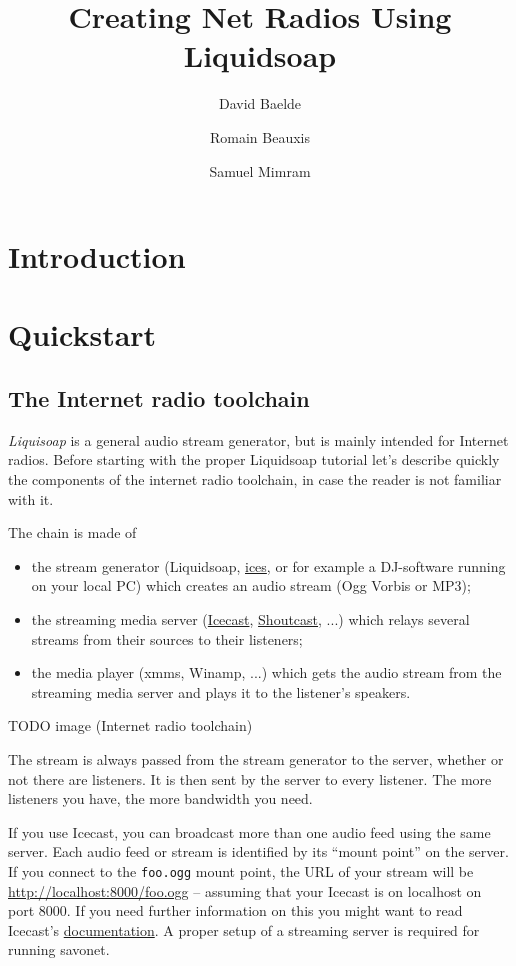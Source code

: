 \documentclass{book}
\author{David Baelde \and Romain Beauxis \and Samuel Mimram}
\title{Creating Net Radios Using Liquidsoap}
\newcommand{\prog}[1]{\emph{#1}}
\newcommand{\Liquidsoap}{\prog{Liquisoap}\xspace}
\begin{document}
\maketitle
\tableofcontents
\chapter{Introduction}

\chapter{Quickstart}
\section{The Internet radio toolchain}
\Liquidsoap is a general audio stream generator, but is mainly intended for
Internet radios. Before starting with the proper Liquidsoap tutorial let's
describe quickly the components of the internet radio toolchain, in case the
reader is not familiar with it.

The chain is made of
\begin{itemize}
\item the stream generator (Liquidsoap,
  \href{http://www.icecast.org/ices.php}{ices}, or for example a DJ-software
  running on your local PC) which creates an audio stream (Ogg Vorbis or MP3);
\item the streaming media server (\href{http://www.icecast.org}{Icecast},
  \href{http://www.shoutcast.com}{Shoutcast}, ...) which relays several streams
  from their sources to their listeners;
\item the media player (xmms, Winamp, ...) which gets the audio stream from the
  streaming media server and plays it to the listener's speakers.
\end{itemize}

TODO image (Internet radio toolchain)

The stream is always passed from the stream generator to the server, whether or
not there are listeners. It is then sent by the server to every listener. The
more listeners you have, the more bandwidth you need.

If you use Icecast, you can broadcast more than one audio feed using the same
server. Each audio feed or stream is identified by its ``mount point'' on the
server. If you connect to the \verb+foo.ogg+ mount point, the URL of your stream
will be \href{http://localhost:8000/foo.ogg}{http://localhost:8000/foo.ogg} --
assuming that your Icecast is on localhost on port 8000. If you need further
information on this you might want to read Icecast's
\href{http://www.icecast.org}{documentation}. A proper setup of a streaming
server is required for running savonet.
\end{document}
